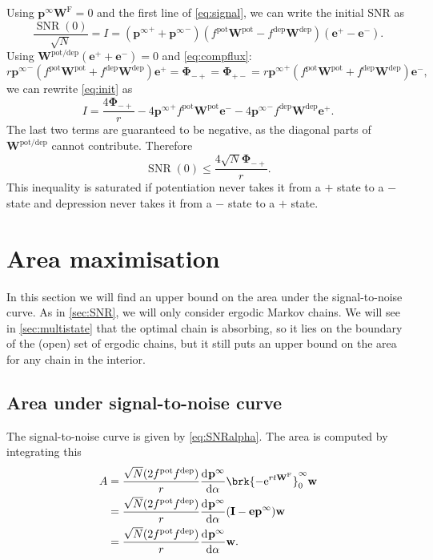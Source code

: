 \documentclass[9pt,twocolumn,twoside,lineno]{pnas-new}
\newcommand{\diff}[3][]{\frac{\mathrm{d}^{#1} #2}{\mathrm{d}{#3}^{#1}}}
\newcommand{\e}{\mathrm{e}}
\DeclareMathOperator{\SNR}{SNR}
\newcommand{\I}{\mathbf{I}}
\newcommand{\onev}{\mathbf{e}}
\newcommand{\prob}{\mathbf{p}}
\newcommand{\eq}{\prob^\infty}
\newcommand{\w}{\mathbf{w}}
\newcommand{\W}{\mathbf{W}}
\newcommand{\frg}{\W^{\mathrm{F}}}
\newcommand{\F}{\boldsymbol{\Phi}}
\newcommand{\pot}{^{\text{pot}}}
\newcommand{\dep}{^{\text{dep}}}
\newcommand{\potdep}{^{\text{pot/dep}}}
\begin{document}
\begin{strip}
Using $\eq\frg=0$ and the first line of \cref{eq:signal}, we can write the initial SNR as
%
\begin{equation}\label{eq:init:s}
  \frac{\SNR(0)}{\sqrt{N}} = I = ({\eq}^++{\eq}^-)(f\pot \W\pot -f\dep \W\dep )(\onev^+-\onev^-).
\end{equation}
%
Using $\W\potdep (\onev^++\onev^-)=0$ and \cref{eq:compflux}:
%
\begin{equation*}
  r{\eq}^-(f\pot \W\pot +f\dep \W\dep )\onev^+ = \F_{-+} = \F_{+-} = r{\eq}^+(f\pot \W\pot +f\dep \W\dep )\onev^-,
\end{equation*}
%
we can rewrite \cref{eq:init} as
%
\begin{equation}\label{eq:initflux:s}
  I = \frac{4\F_{-+}}{r} - 4{\eq}^+f\pot \W\pot \onev^- - 4{\eq}^-f\dep \W\dep \onev^+.
\end{equation}
%
The last two terms are guaranteed to be negative, as the diagonal parts of $\W\potdep $ cannot contribute.
Therefore
%
\begin{equation}\label{eq:initfluxineq}
  \SNR(0) \leq \frac{4\sqrt{N}\F_{-+}}{r}.
\end{equation}
%
This inequality is saturated if potentiation never takes it from a $+$ state to a $-$ state and depression never takes it from a $-$ state to a $+$ state.


\section{Area maximisation}\label{sec:areamax}

In this section we will find an upper bound on the area under the signal-to-noise curve.
As in \cref{sec:SNR}, we will only consider ergodic Markov chains.
We will see in \cref{sec:multistate} that the optimal chain is absorbing, so it lies on the boundary of the (open) set of ergodic chains, but it still puts an upper bound on the area for any chain in the interior.

\subsection{Area under signal-to-noise curve}\label{sec:areadef}

The signal-to-noise curve is given by \cref{eq:SNRalpha}.
The area is computed by integrating this
%
\begin{equation}\label{eq:area:s}
\begin{aligned}
  A &= \frac{\sqrt{N}(2f\pot f\dep )}{r} \diff{\eq}{\alpha} \brk{-\e^{rt\frg}}_0^\infty \w \\
    &= \frac{\sqrt{N}(2f\pot f\dep )}{r} \diff{\eq}{\alpha} (\I-\onev\eq) \w \\
    &= \frac{\sqrt{N}(2f\pot f\dep )}{r} \diff{\eq}{\alpha} \w.
\end{aligned}
\end{equation}
%


\end{strip}
\end{document}
